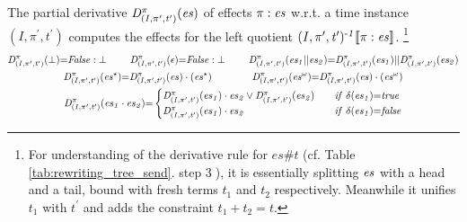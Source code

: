 \documentclass[acmsmall,10pt,review]{acmart}
\newcommand{\es}{\textcolor{black}{\ensuremath{{es}}}}
\newcommand{\timedEffects}{\emph{TimEffs}}
\newcommand{\seq}{\cdot}
\newcommand{\code}[1]{{\tt{\ensuremath{\m{#1}}}}}
\newcommand{\esn}[2]{\ensuremath{#1^{#2}}}
\newcommand{\empt}{\textcolor{black}{\ensuremath{\epsilon}}}
\newcommand{\bott}{\textcolor{black}{\ensuremath{\bot}}}
\newcommand{\m}{\mathit}
\newcommand\tabref[1]{Table \textcolor{black}{\ref{#1}}.}
\begin{document}
{\begin{definition}[Partial Derivative\footnote{Intuitively, the partial derivative refers to the left quotient of a language equation, for example, for REs, \code{x^{{-}1} \llbracket x\cdot y\rrbracket {=} y};  \code{y^{{-}1} \llbracket x\cdot y\rrbracket {=} \bott}; and  \code{y^{{-}1} \llbracket x + y\rrbracket {=} \epsilon}. Here we come up with a new notion of partial derivative for \timedEffects. 
}]\label{Derivative}
The partial derivative \code{D^{\pi}_{(I, \pi^\prime, t^\prime)}(\es)} 
of effects \code{\pi : \es} 
w.r.t. a time instance \code{(I, \pi^\prime, t^\prime)} computes the  effects for the left quotient \code{(I, \pi^\prime, t^\prime)^{\text{-}1}\llbracket \pi : \es \rrbracket}. \footnote{For understanding of the derivative rule for \code{es\# t} (cf. \tabref{tab:rewriting_tree_send}  step \textcircled{3}), it is essentially splitting \code{\es} with a head and a tail, bound with fresh terms \code{t_1} and \code{t_2} respectively. Meanwhile it unifies \code{t_1} with \code{t^\prime} and  adds the constraint \code{t_1 {+} t_2 {=} t}.}
\begin{gather*}
\code{D^{\pi}_{(I, \pi^\prime, t^\prime)}(\bott) {=}}  
 \code{False : \bott} 
\qquad\ 
\code{D^{\pi}_{(I, \pi^\prime, t^\prime)}(  \empt) {=}}   
\code{False : \bott} 
\qquad \ 
\code{D^{\pi}_{(I, \pi^\prime, t^\prime)}(es_1 || es_2)} {=} \code{D^{\pi}_{(I, \pi^\prime, t^\prime)}(es_1)} || \code{D^{\pi}_{(I, \pi^\prime, t^\prime)}( es_2)} 
    \\
        \code{D^{\pi}_{(I, \pi^\prime, t^\prime)}(  \esn{\es}{\star}) } {=} \code{ D^{\pi}_{(I, \pi^\prime, t^\prime)}(  {\es}) \cdot (\esn{\es}{\star})}  
        \qquad\qquad
                \code{D^{\pi}_{(I, \pi^\prime, t^\prime)}(  \esn{\es}{\omega}) } {=} \code{ D^{\pi}_{(I, \pi^\prime, t^\prime)}(  {\es}) \cdot (\esn{\es}{\omega})}  
\\
{
 \code{D^{\pi}_{(I, \pi^\prime, t^\prime)}(   \es_1 \seq \es_2) {=} }
\begin{cases}
      \code{D^{\pi}_{(I, \pi^\prime, t^\prime)}(   \es_1) \cdot  \es_2 \vee  D^{\pi}_{(I, \pi^\prime, t^\prime)}( \es_2)} \quad &\code{if\ \delta(\es_1) {=} true}   \\
      \code{D^{\pi}_{(I, \pi^\prime, t^\prime)}  ( \es_1) \cdot  \es_2} & \code{if\ \delta(\es_1) {=} false} 
    \end{cases} 
}
\end{gather*}
\end{definition}}
\end{document}
